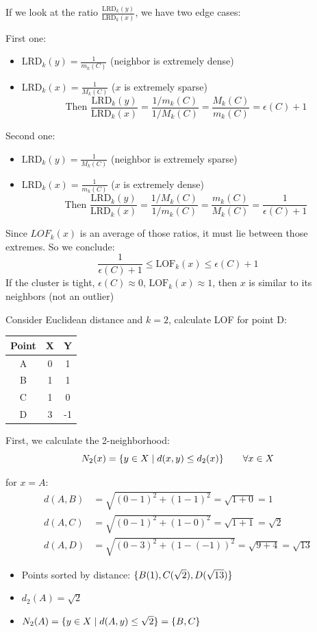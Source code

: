 \documentclass{article}
\begin{document}
If we look at the ratio $\frac{\text{LRD}_k(y)}{\text{LRD}_k(x)}$, we have two edge cases:

First one:
\begin{itemize}
    \item $\text{LRD}_k(y) = \frac{1}{m_k(C)}$ (neighbor is extremely dense)
    \item $\text{LRD}_k(x) = \frac{1}{M_k(C)}$ ($x$ is extremely sparse)
    \[
    \text{Then }\frac{\text{LRD}_k(y)}{\text{LRD}_k(x)} = \frac{1/m_k(C)}{1/M_k(C)} = \frac{M_k(C)}{m_k(C)} = \epsilon(C) + 1
    \]
\end{itemize}


Second one:
\begin{itemize}
    \item $\text{LRD}_k(y) = \frac{1}{M_k(C)}$ (neighbor is extremely sparse)
    \item $\text{LRD}_k(x) = \frac{1}{m_k(C)}$ ($x$ is extremely dense)
    \[
    \text{Then }\frac{\text{LRD}_k(y)}{\text{LRD}_k(x)} = \frac{1/M_k(C)}{1/m_k(C)} = \frac{m_k(C)}{M_k(C)} = \frac{1}{\epsilon(C) + 1} 
    \]
\end{itemize}
Since $LOF_k(x)$ is an average of those ratios, it must lie between those extremes. So we conclude:
\[
\frac{1}{\epsilon(C) + 1}  \leq \text{LOF}_k(x) \leq \epsilon(C) + 1
\]
If the cluster is tight, $\epsilon(C) \approx 0$, $\text{LOF}_k(x) \approx 1$, then $x$ is similar to its neighbors (not an outlier)

Consider Euclidean distance and $k=2$, calculate LOF for point D:
\begin{tabular}{|c|c|c|} \hline
    \textbf{Point} & \textbf{X} & \textbf{Y} \\ \hline  
    A&0&1 \\ \hline 
    B&1&1 \\ \hline 
    C&1&0 \\\hline 
    D&3&-1 \\ \hline
\end{tabular}

First, we calculate the 2-neighborhood:
\[
N_2(x) = \{y \in X \mid d(x, y) \leq d_2(x)\} \qquad \forall x \in X
\]

for $x = A$:
\begin{align*}
    d(A,B) &= \sqrt{(0-1)^2 + (1 - 1)^2} = \sqrt{1 + 0} = 1 \\
    d(A,C) &= \sqrt{(0-1)^2 + (1 - 0)^2} = \sqrt{1 + 1} = \sqrt{2} \\
    d(A,D) &= \sqrt{(0-3)^2 + (1 - (-1))^2} = \sqrt{9 + 4} = \sqrt{13}
\end{align*}
\begin{itemize}
    \item Points sorted by distance: $\{B (1), C (\sqrt{2}), D (\sqrt{13})\}$
    \item $d_2(A) = \sqrt{2}$
    \item $N_2(A) = \{y \in X \mid d(A, y) \leq \sqrt{2}\} = \{B,C\}$
\end{itemize}
\end{document}
